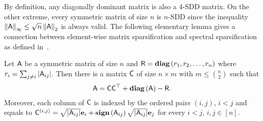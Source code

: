 %
By definition, any diagonally dominant matrix is also a $4$-SDD matrix. On the other extreme, every symmetric matrix of size $n$ is $n$-SDD since the inequality $\left\|{\mathsf{A} }\right\|_\infty\leq \sqrt{n} \left\|{\mathsf{A} }\right\|_2$ is always valid. The following elementary lemma gives a connection between element-wise matrix sparsification and spectral sparsification as defined in~\cite{phdthesis:Srivastava:2010}.
\begin{lemma}\label{lem:sparsif:decomp}
Let ${\mathsf{A} }$ be a symmetric matrix of size $n$ and ${\mathsf{R} }=\operatorname{\textbf{diag}}\left(r_1,r_2,\ldots ,r_n\right)$ where $r_i = \sum_{j\neq i} |{\mathsf{A} }_{ij}|$. Then there is a matrix ${\mathsf{C} }$ of size $n\times m$ with $m \leq \binom{n}{2}$ such that
\begin{align}\label{eqn:sparsify_lemma}
 {\ensuremath{\mathsf{A} }} = {\mathsf{C} }{\mathsf{C} }^\top +\operatorname{\textbf{diag}}\left({\mathsf{A} }\right) - {\mathsf{R} }.
\end{align}
Moreover, each column of ${\mathsf{C} }$ is indexed by the ordered pairs $(i,j)$, $i<j$ and equals to ${\mathsf{C} }^{(i,j)} = \sqrt{|{\mathsf{A} }_{ij}|} {\mathbf e}_i + \operatorname{\textbf{sign}}\left({\mathsf{A} }_{ij}\right)  \sqrt{|{\mathsf{A} }_{ij}|} {\mathbf e}_j$ for every $i<j$, $i,j\in[n]$.
\end{lemma}

